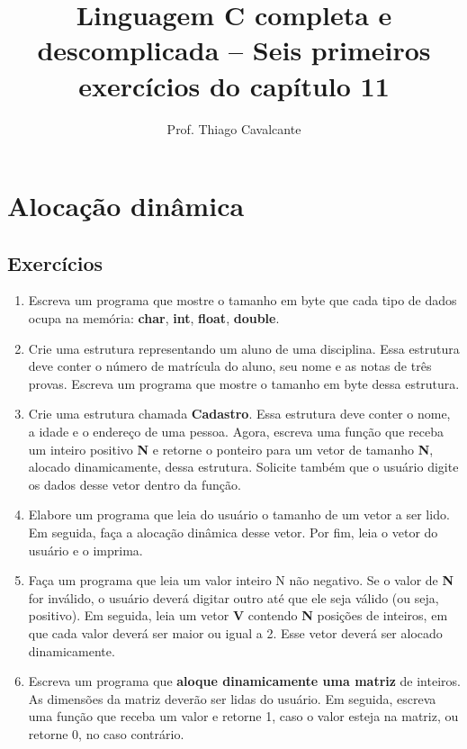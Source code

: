 \documentclass[a4paper,12pt]{article}
\title{Linguagem C completa e descomplicada -- Seis primeiros exercícios do capítulo 11}
\author{Prof. Thiago Cavalcante}
\date{}
\begin{document}
\maketitle

\sloppy
\raggedright

\setcounter{section}{10}
\section{Alocação dinâmica}

\setcounter{subsection}{3}
\subsection{Exercícios}

\begin{enumerate}
  \item Escreva um programa que mostre o tamanho em byte que cada tipo de dados ocupa na memória: \textbf{char}, \textbf{int}, \textbf{float}, \textbf{double}.
  \item Crie uma estrutura representando um aluno de uma disciplina. Essa estrutura deve conter o número de matrícula do aluno, seu nome e as notas de três provas. Escreva um programa que mostre o tamanho em byte dessa estrutura.
  \item Crie uma estrutura chamada \textbf{Cadastro}. Essa estrutura deve conter o nome, a idade e o endereço de uma pessoa. Agora, escreva uma função que receba um inteiro positivo \textbf{N} e retorne o ponteiro para um vetor de tamanho \textbf{N}, alocado dinamicamente, dessa estrutura. Solicite também que o usuário digite os dados desse vetor dentro da função.
  \item Elabore um programa que leia do usuário o tamanho de um vetor a ser lido. Em seguida, faça a alocação dinâmica desse vetor. Por fim, leia o vetor do usuário e o imprima.
  \item Faça um programa que leia um valor inteiro N não negativo. Se o valor de \textbf{N} for inválido, o usuário deverá digitar outro até que ele seja válido (ou seja, positivo). Em seguida, leia um vetor \textbf{V} contendo \textbf{N} posições de inteiros, em que cada valor deverá ser maior ou igual a 2. Esse vetor deverá ser alocado dinamicamente.
  \item Escreva um programa que \textbf{aloque dinamicamente uma matriz} de inteiros. As dimensões da matriz deverão ser lidas do usuário. Em seguida, escreva uma função que receba um valor e retorne 1, caso o valor esteja na matriz, ou retorne 0, no caso contrário.
\end{enumerate}
\end{document}
